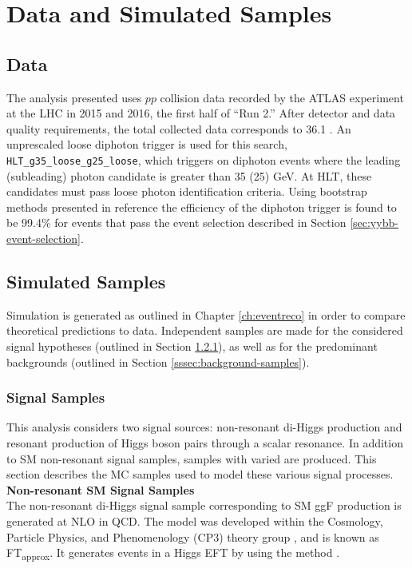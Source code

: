 \section{Data and Simulated Samples}


\subsection{Data}

The analysis presented uses $pp$ collision data recorded by the ATLAS experiment at the LHC in 2015 and 2016, the first half of ``Run 2.'' After detector and data quality requirements, the total collected data corresponds to 36.1 \ifb. An unprescaled loose diphoton trigger is used for this search, \texttt{HLT\_g35\_loose\_g25\_loose}, which triggers on diphoton events where the leading (subleading) photon candidate \pt is greater than 35 (25) GeV. At \gls{HLT}, these candidates must pass loose photon identification criteria. Using bootstrap methods presented in reference \cite{trigger-unc} the efficiency of the diphoton trigger is found to be 99.4\% for events that pass the event selection described in Section \ref{sec:yybb-event-selection}.

\subsection{Simulated Samples}

Simulation is generated as outlined in Chapter \ref{ch:eventreco} in order to compare theoretical predictions to data. Independent samples are made for the considered signal hypotheses (outlined in Section \ref{sssec:signal-samples}), as well as for the predominant backgrounds (outlined in Section \ref{sssec:background-samples}).

\subsubsection{Signal Samples} \label{sssec:signal-samples}

This analysis considers two signal sources: non-resonant di-Higgs production and resonant production of Higgs boson pairs through a scalar resonance. In addition to \gls{SM} non-resonant signal samples, samples with varied \klambda are produced. This section describes the \gls{MC} samples used to model these various signal processes.\\

\noindent\textbf{Non-resonant \gls{SM} Signal Samples}\\
\indent The non-resonant di-Higgs signal sample corresponding to \gls{SM} \gls{ggF} \hh production is generated at \gls{NLO} in \gls{QCD}. The model was developed within the Cosmology, Particle Physics, and Phenomenology (CP3) theory group \cite{top-quark-massrw}, and is known as FT\textsubscript{approx}. It generates events in a Higgs \gls{EFT} by using the \AMCatNLO method \cite{amc-at-nlo}.

